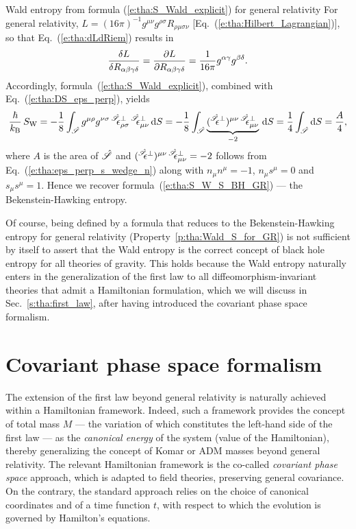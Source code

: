 \begin{texample}{Wald entropy from formula (\ref{e:tha:S_Wald_explicit}) for general relativity}{}
For general relativity,
$L = (16\pi)^{-1} g^{\mu\nu} g^{\rho\sigma} R_{\rho\mu\sigma\nu}$
[Eq.~(\ref{e:tha:Hilbert_Lagrangian})], so that Eq.~(\ref{e:tha:dLdRiem}) results in
\[
    \frac{\delta L}{\delta R_{\alpha\beta\gamma\delta}} = \frac{\partial L}{\partial R_{\alpha\beta\gamma\delta}}
    = \frac{1}{16\pi} g^{\alpha\gamma} g^{\beta\delta} .
\]
Accordingly, formula~(\ref{e:tha:S_Wald_explicit}), combined with Eq.~(\ref{e:tha:DS_eps_perp}), yields
\[
    \frac{\hbar}{k_{\rm  B}} \, S_{\rm W}  = -\frac{1}{8} \int_{\hat{\Sp}} g^{\mu\rho} g^{\nu\sigma} \,
    {}^{\hat{\Sp}}\!\!\eps^\perp_{\rho\sigma} \, {}^{\hat{\Sp}}\!\!\eps^\perp_{\mu\nu} \,
    \D S
    = - \frac{1}{8} \int_{\hat{\Sp}}
    \underbrace{({}^{\hat{\Sp}}\!\!\eps^\perp)^{\mu\nu} \, {}^{\hat{\Sp}}\!\!\eps^\perp_{\mu\nu}}_{-2} \,  \D S
    = \frac{1}{4} \int_{\hat{\Sp}} \D S  = \frac{A}{4} ,
\]
where $A$ is the area of $\hat{\mathscr{S}}$ and $({}^{\hat{\mathscr{S}}}\!\!\epsilon^\perp)^{\mu\nu} \, {}^{\hat{\mathscr{S}}}\!\!\epsilon^\perp_{\mu\nu}=-2$
follows from Eq.~(\ref{e:tha:eps_perp_s_wedge_n}) along with
$n_\mu n^\mu = -1$, $n_\mu s^\mu = 0$ and $s_\mu s^\mu = 1$.
Hence we recover formula~(\ref{e:tha:S_W_S_BH_GR}) --- the Bekenstein-Hawking entropy.
\end{texample}

Of course, being defined by a formula that reduces to the Bekenstein-Hawking entropy
for general relativity (Property~\ref{p:tha:Wald_S_for_GR})
is not sufficient by itself to assert that the Wald entropy
is the correct concept of black hole entropy for all theories
of gravity. This holds because the Wald entropy naturally enters in the
generalization of the first law to all diffeomorphism-invariant theories
that admit a Hamiltonian formulation, which we will discuss in Sec.~\ref{s:tha:first_law},
after having introduced the covariant phase space formalism.



\section{Covariant phase space formalism}

The extension of the first law beyond general relativity is naturally achieved
within a Hamiltonian framework. Indeed, such a framework provides the concept
of total mass $M$ --- the variation of which constitutes the left-hand side of the first law --- as the \emph{canonical energy} of the system (value of the Hamiltonian),
thereby generalizing the concept of Komar or ADM masses beyond general relativity.
The relevant Hamiltonian framework is the co-called \emph{covariant phase space} approach,
which is adapted to field theories, preserving general covariance.
On the contrary, the standard approach relies on the choice of
canonical coordinates and of
a time function $t$, with respect to which the evolution is governed by
Hamilton's equations.

